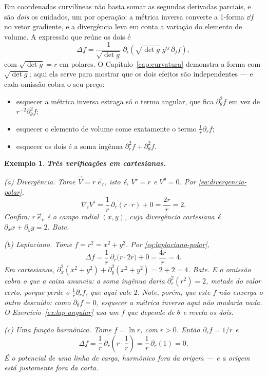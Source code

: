 \documentclass[12pt,a4paper,oneside]{book}
\theoremstyle{rgplain}
\newtheorem{example}{Exemplo}[chapter]
\theoremstyle{rgremark}
\begin{document}
\begin{atencao}
Em coordenadas curvilíneas não basta somar as segundas derivadas parciais, e
são \emph{dois} os cuidados, um por operação: a métrica inversa converte a
1-forma $\dd f$ no vetor gradiente, e a divergência leva em conta a variação
do elemento de volume. A expressão que reúne os dois é
\[
  \Delta f=\frac{1}{\sqrt{\det g}}\,
  \partial_i\!\left(\sqrt{\det g}\;g^{ij}\,\partial_jf\right),
\]
com $\sqrt{\det g}=r$ em polares. O Capítulo~\ref{cap:curvatura} demonstra a
forma com $\sqrt{\det g}$; aqui ela serve para mostrar que os dois efeitos são
independentes --- e cada omissão cobra o seu preço:
\begin{itemize}
  \item esquecer a métrica inversa estraga só o termo angular, que fica
  $\partial^2_\theta f$ em vez de $r^{-2}\partial^2_\theta f$;
  \item esquecer o elemento de volume come exatamente o termo
  $\frac1r\partial_rf$;
  \item esquecer os dois é a soma ingênua
  $\partial_r^2f+\partial_\theta^2f$.
\end{itemize}
\end{atencao}

\begin{example}
\textbf{Três verificações em cartesianas.}

\emph{(a) Divergência.} Tome $\vec V=r\,\vec e_r$, isto é, $V^r=r$ e
$V^\theta=0$. Por \eqref{eq:divergencia-polar},
\[
  \nabla_iV^i=\frac1r\,\partial_r(r\cdot r)+0=\frac{2r}{r}=2 .
\]
Confira: $r\,\vec e_r$ é o campo radial $(x,y)$, cuja divergência cartesiana é
$\partial_xx+\partial_yy=2$. Bate.

\emph{(b) Laplaciano.} Tome $f=r^2=x^2+y^2$. Por
\eqref{eq:laplaciano-polar},
\[
  \Delta f=\frac1r\,\partial_r\bigl(r\cdot2r\bigr)+0=\frac{4r}{r}=4 .
\]
Em cartesianas, $\partial_x^2(x^2+y^2)+\partial_y^2(x^2+y^2)=2+2=4$. Bate. E
a omissão cobra o que a caixa anuncia: a soma ingênua daria
$\partial_r^2(r^2)=2$, metade do valor certo, porque perde o
$\frac1r\partial_rf$, que aqui vale $2$. Note, porém, que este $f$ não
enxerga o \emph{outro} descuido: como $\partial_\theta f=0$, esquecer a
métrica inversa aqui não mudaria nada. O Exercício~\ref{ex:lap-angular} usa um
$f$ que depende de $\theta$ e revela os dois.

\emph{(c) Uma função harmônica.} Tome $f=\ln r$, com $r>0$. Então
$\partial_rf=1/r$ e
\[
  \Delta f=\frac1r\,\partial_r\!\left(r\cdot\frac1r\right)
  =\frac1r\,\partial_r(1)=0 .
\]
É o potencial de uma linha de carga, harmônico fora da origem --- e a origem
está justamente fora da carta.
\end{example}
\end{document}
